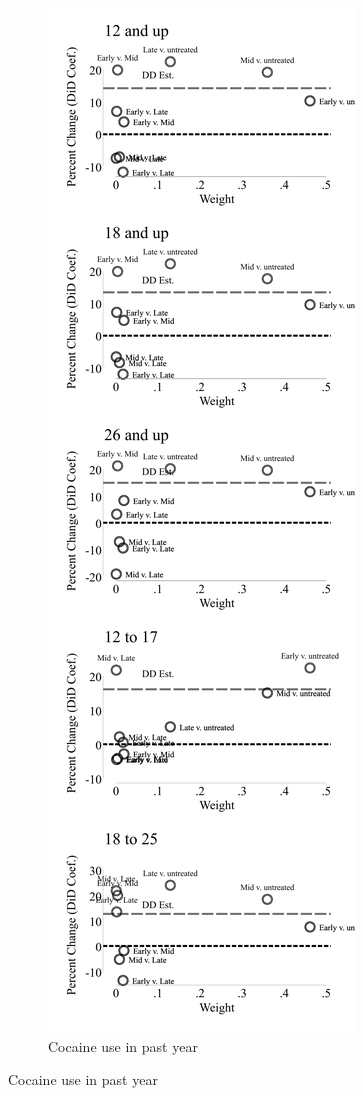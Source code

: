 \documentclass[12pt]{article}%
\begin{document}
\begin{figure}
\begin{minipage}{.9\linewidth}
\begin{subfigure}[b]{0.32\columnwidth}
    \label{fig:bacon_lead_lag_tob_30}
  \end{subfigure}
   \hfill %
  \begin{subfigure}[b]{0.32\columnwidth}
    \caption{\scriptsize{Cocaine use in past year}}
    \includegraphics[width=\linewidth]{../output/plots/bacon_weights_ln_coke_use_365.pdf}

\end{subfigure}
\end{minipage}
\end{figure}
\end{document}
